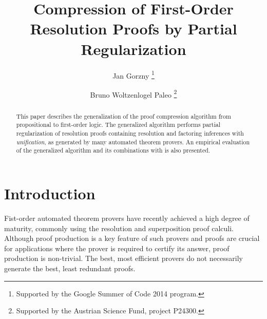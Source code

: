 \documentclass{llncs}
\title{Compression of First-Order Resolution Proofs by Partial Regularization} %
\author{
  Jan Gorzny\inst{1}
  \thanks{Supported by the Google Summer of Code 2014 program.}
  \and 
  Bruno Woltzenlogel Paleo\inst{2}
  \thanks{Supported by the Austrian Science Fund, project P24300.}
}
\institute{
  \email{jgorzny@uvic.ca}, University of Victoria, Canada
  \and 
  \email{bruno@logic.at}, Vienna University of Technology, Austria
}
\begin{document}
\maketitle


\begin{abstract}
This paper describes the generalization of the 
proof compression algorithm
\RecyclePivotsIntersection 
from propositional to first-order logic. The generalized algorithm performs partial regularization of resolution proofs containing resolution and factoring inferences with \emph{unification}, as generated by many automated theorem provers. An empirical evaluation of the generalized algorithm and its combinations with \SFOLowerUnits is also presented.
\end{abstract}


\setcounter{footnote}{0}

\section{Introduction}

Fist-order automated theorem provers have recently achieved a high degree of maturity, commonly using the resolution and superposition proof calculi. Although proof production is a key feature of such provers and proofs are crucial for applications where the prover is required to certify its answer, proof production is non-trivial. The best, most efficient provers do not necessarily generate the best, least redundant proofs.
\end{document}
